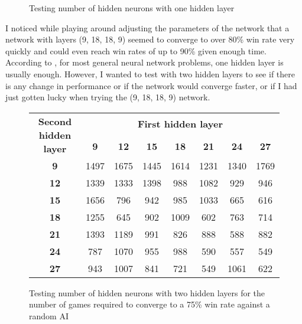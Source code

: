 \documentclass{article}
\newcommand{\n}[0]{\\[\baselineskip]}
\begin{document}
\begin{figure}[H] 
\caption{Testing number of hidden neurons with one hidden layer}
\label{1hiddenlayer}
\end{figure}
I noticed while playing around adjusting the parameters of the network that a network with layers (9, 18, 18, 9) seemed to converge to over 80\% win rate very quickly and could even reach win rates of up to 90\% given enough time. According to \cite{faq}, for most general neural network problems, one hidden layer is usually enough. However, I wanted to test with two hidden layers to see if there is any change in performance or if the network would converge faster, or if I had just gotten lucky when trying the (9, 18, 18, 9) network. 
\n
\begin{figure}[H]
\begin{tabular}{ |c|c|c|c|c|c|c|c| }
\hline
\multirow{2}{10.5em}{\textbf{Second hidden layer}} & \multicolumn{7}{c|}{\textbf{First hidden layer}} \\
\cline{2-8}
& \textbf{9} & \textbf{12} & \textbf{15} & \textbf{18} & \textbf{21} & \textbf{24} & \textbf{27} \\
\hline
\textbf{9} & 1497 & 1675 & 1445 & 1614 & 1231 & 1340 & 1769\\
\hline
\textbf{12} & 1339 & 1333 & 1398 & 988 & 1082 & 929 & 946 \\
\hline
\textbf{15} & 1656 & 796 & 942 & 985 & 1033 & 665 & 616\\
\hline
\textbf{18} & 1255 & 645 & 902 & 1009 & 602 & 763 & 714\\
\hline
\textbf{21} & 1393 & 1189 & 991 & 826 & 888 & 588 & 882\\
\hline
\textbf{24} & 787 & 1070 & 955 & 988 & 590 & 557 & 549\\
\hline
\textbf{27} & 943 & 1007 & 841 & 721 & 549 & 1061 & 622 \\
\hline
\end{tabular}
\caption{Testing number of hidden neurons with two hidden layers for the number of games required to converge to a 75\% win rate against a random AI}
\label{2hiddenlayers}
\end{figure}
\end{document}
